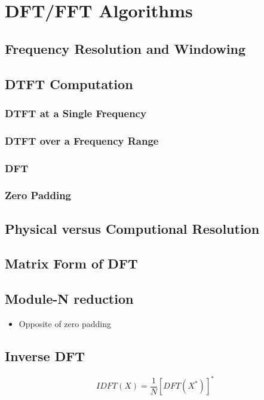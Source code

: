 \section{DFT/FFT Algorithms}
\subsection{Frequency Resolution and Windowing}

\subsection{DTFT Computation}
\subsubsection{DTFT at a Single Frequency}
\subsubsection{DTFT over a Frequency Range}
\subsubsection{DFT}
\subsubsection{Zero Padding}

\subsection{Physical versus Computional Resolution}

\subsection{Matrix Form of DFT}

\subsection{Module-N reduction}
\begin{itemize}
	\item Opposite of zero padding
\end{itemize}


\subsection{Inverse DFT}
\begin{equation}
	IDFT(X) = \frac{1}{N}\left[DFT(X^*)\right]^*
	\label{eq:IDFT}
\end{equation}

